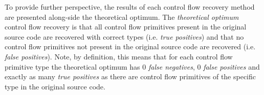 To provide further perspective, the results of each control flow recovery method are presented along-side the theoretical optimum. The \textit{theoretical optimum} control flow recovery is that all control flow primitives present in the original source code are recovered with correct types (i.e. \textit{true positives}) and that no control flow primitives not present in the original source code are recovered (i.e. \textit{false positives}). Note, by definition, this means that for each control flow primitive type the theoretical optimum has 0 \textit{false negatives}, 0 \textit{false positives} and exactly as many \textit{true positives} as there are control flow primitives of the specific type in the original source code.







